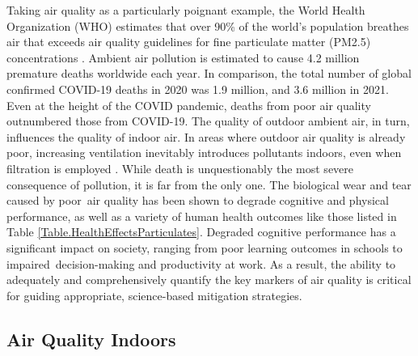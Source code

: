 Taking air quality as a particularly poignant example, the World Health Organization (WHO) estimates that over 90\% of the world's population breathes air that exceeds air quality guidelines for fine particulate matter (PM2.5) concentrations \cite{world2021global}. Ambient air pollution is estimated to cause 4.2 million premature deaths worldwide each year. In comparison, the total number of global confirmed COVID-19 deaths in 2020 was 1.9 million, and 3.6 million in 2021. Even at the height of the COVID pandemic, deaths from poor air quality outnumbered those from COVID-19. The quality of outdoor ambient air, in turn, influences the quality of indoor air. In areas where outdoor air quality is already poor, increasing ventilation inevitably introduces pollutants indoors, even when filtration is employed \cite{srikrishna_long-term_2022}. While death is unquestionably the most severe consequence of pollution, it is far from the only one. The biological wear and tear caused by poor air quality has been shown to degrade cognitive and physical performance, as well as a variety of human health outcomes \cite{Krebs2021AirPC, Gao2021ShorttermAP, Carneiro2021TheEO, Ni2021AssociationsOP, Shehab2019EffectsOS} like those listed in Table \ref{Table.HealthEffectsParticulates}. Degraded cognitive performance has a significant impact on society, ranging from poor learning outcomes in schools to impaired decision-making and productivity at work. As a result, the ability to adequately and comprehensively quantify the key markers of air quality is critical for guiding appropriate, science-based mitigation strategies.

\subsection{Air Quality Indoors}

